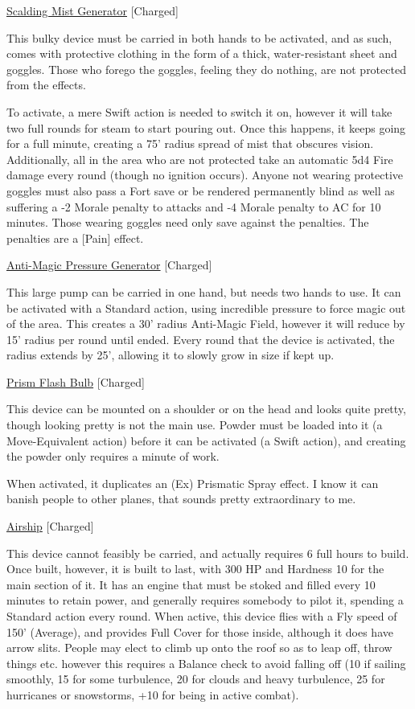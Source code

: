 \medskip\noindent\underline{Scalding Mist Generator} [Charged] 

\noindent This bulky device must be carried in both hands to be activated, and as such, comes with protective clothing in the form of a thick, water-resistant sheet and goggles. Those who forego the goggles, feeling they do nothing, are not protected from the effects. 

\smallskip\noindent To activate, a mere Swift action is needed to switch it on, however it will take two full rounds for steam to start pouring out. Once this happens, it keeps going for a full minute, creating a 75' radius spread of mist that obscures vision. Additionally, all in the area who are not protected take an automatic 5d4 Fire damage every round (though no ignition occurs). Anyone not wearing protective goggles must also pass a Fort save or be rendered permanently blind as well as suffering a -2 Morale penalty to attacks and -4 Morale penalty to AC for 10 minutes. Those wearing goggles need only save against the penalties. The penalties are a [Pain] effect. 

\medskip\noindent\underline{Anti-Magic Pressure Generator} [Charged] 

\noindent This large pump can be carried in one hand, but needs two hands to use. It can be activated with a Standard action, using incredible pressure to force magic out of the area. This creates a 30' radius Anti-Magic Field, however it will reduce by 15' radius per round until ended. Every round that the device is activated, the radius extends by 25', allowing it to slowly grow in size if kept up. 

\medskip\noindent\underline{Prism Flash Bulb} [Charged] 

\noindent This device can be mounted on a shoulder or on the head and looks quite pretty, though looking pretty is not the main use. Powder must be loaded into it (a Move-Equivalent action) before it can be activated (a Swift action), and creating the powder only requires a minute of work. 

\smallskip\noindent When activated, it duplicates an (Ex) Prismatic Spray effect. I know it can banish people to other planes, that sounds pretty extraordinary to me. 

\medskip\noindent\underline{Airship} [Charged] 

\noindent This device cannot feasibly be carried, and actually requires 6 full hours to build. Once built, however, it is built to last, with 300 HP and Hardness 10 for the main section of it. It has an engine that must be stoked and filled every 10 minutes to retain power, and generally requires somebody to pilot it, spending a Standard action every round. When active, this device flies with a Fly speed of 150' (Average), and provides Full Cover for those inside, although it does have arrow slits. People may elect to climb up onto the roof so as to leap off, throw things etc. however this requires a Balance check to avoid falling off (10 if sailing smoothly, 15 for some turbulence, 20 for clouds and heavy turbulence, 25 for hurricanes or snowstorms, +10 for being in active combat). 

